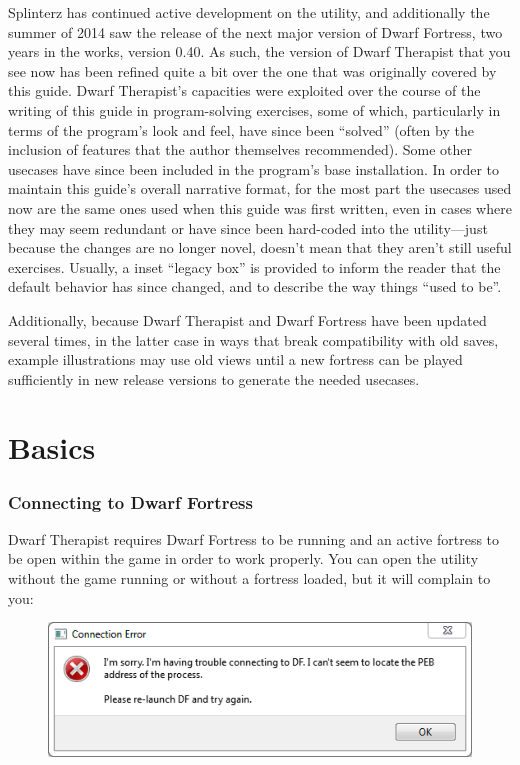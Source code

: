 \documentclass[]{article}
\begin{document}
Splinterz has continued active development on the utility, and additionally the summer of 2014 saw the
release of the next major version of Dwarf Fortress, two years in the works, version 0.40. As such, the
version of Dwarf Therapist that you see now has been refined quite a bit over the one that was originally
covered by this guide. Dwarf Therapist's capacities were exploited over the course of the writing of this
guide in program-solving exercises, some of which, particularly in terms of the program's look and feel,
have since been ``solved'' (often by the inclusion of features that the author themselves recommended).
Some other usecases have since been included in the program's base installation. In order to
maintain this guide's overall narrative format, for the most part the usecases used now are the same
ones used when this guide was first written, even in cases where they may seem redundant or have since
been hard-coded into the utility---just because the changes are no longer novel, doesn't mean that they
aren't still useful exercises. Usually, a inset ``legacy box'' is provided to inform the reader that the
default behavior has since changed, and to describe the way things ``used to be''.

Additionally, because Dwarf Therapist and Dwarf Fortress have been updated several times, in the latter
case in ways that break compatibility with old saves, example illustrations may use old views until a new
fortress can be played sufficiently in new release versions to generate the needed usecases.

\newpage

\part{Basics}
\section{Connecting to Dwarf Fortress}
\label{sec:Connecting to Dwarf Fortress}

Dwarf Therapist requires Dwarf Fortress to be running and an active fortress to be open within the game
in order to work properly. You can open the utility without the game running or without a fortress
loaded, but it will complain to you:

\begin{figure}[h!] \centering
\includegraphics[width=.7\linewidth]{Sec1Fig1}
\end{figure}
\end{document}
